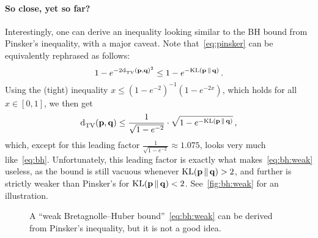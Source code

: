 \documentclass[10pt]{article}
\newcommand{\p}{\mathbf{p}}
\newcommand{\q}{\mathbf{q}}
\begin{document}
\paragraph{So close, yet so far?}
Interestingly, one can derive an inequality looking similar to the BH bound from Pinsker's inequality, with a major caveat. Note that~\eqref{eq:pinsker} can be equivalently rephrased as follows:
\begin{equation}
  1-e^{-2\totalvardist{\p}{\q}^2} \leq 1-e^{-\kldiv{\p}{\q}}\,.
\end{equation}
Using the (tight) inequality $x\leq (1-e^{-2})^{-1}(1-e^{-2x})$, which holds for all $x\in[0,1]$, we then get
\begin{equation}
  \label{eq:bh:weak}
  \totalvardist{\p}{\q} \leq \frac{1}{\sqrt{1-e^{-2}}}\cdot\sqrt{1-e^{-\kldiv{\p}{\q}}}\,,
\end{equation}
which, except for this leading factor $\frac{1}{\sqrt{1-e^{-2}}} \approx 1.075$, looks very much like~\eqref{eq:bh}. Unfortunately, this leading factor is exactly what makes~\eqref{eq:bh:weak} useless, as the bound is still vacuous whenever $\kldiv{\p}{\q}>2$, and further is strictly weaker than Pinsker's for $\kldiv{\p}{\q}<2$. See~\autoref{fig:bh:weak} for an illustration.

\begin{figure}[ht!]\centering
{} 
\caption{\label{fig:bh:weak}A ``weak Bretagnolle--Huber bound''~\eqref{eq:bh:weak} can be derived from Pinsker's inequality, but it is not a good idea.}
\end{figure}

\end{document}
